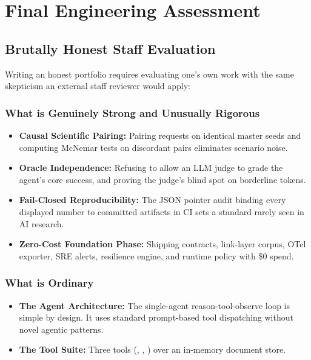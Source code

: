 \section{Final Engineering Assessment}

\subsection{Brutally Honest Staff Evaluation}
Writing an honest portfolio requires evaluating one's own work with the same skepticism an external staff reviewer would apply:

\subsubsection{What is Genuinely Strong and Unusually Rigorous}
\begin{itemize}
\setlength{\itemsep}{1pt}\setlength{\parskip}{0pt}
    \item \textbf{Causal Scientific Pairing:} Pairing requests on identical master seeds and computing McNemar tests on discordant pairs eliminates scenario noise.
    \item \textbf{Oracle Independence:} Refusing to allow an LLM judge to grade the agent's core success, and proving the judge's blind spot on borderline tokens.
    \item \textbf{Fail-Closed Reproducibility:} The JSON pointer audit binding every displayed number to committed artifacts in CI sets a standard rarely seen in AI research.
    \item \textbf{Zero-Cost Foundation Phase:} Shipping contracts, link-layer corpus, OTel exporter, SRE alerts, resilience engine, and runtime policy with \$0 spend.
\end{itemize}

\subsubsection{What is Ordinary}
\begin{itemize}
\setlength{\itemsep}{1pt}\setlength{\parskip}{0pt}
    \item \textbf{The Agent Architecture:} The single-agent reason-tool-observe loop is simple by design. It uses standard prompt-based tool dispatching without novel agentic patterns.
    \item \textbf{The Tool Suite:} Three tools (, , ) over an in-memory document store.
\end{itemize}


